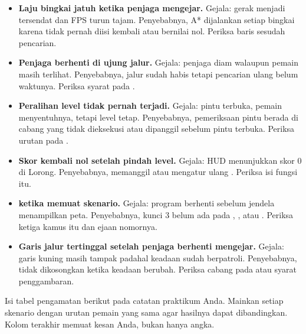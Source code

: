 \begin{galatbox}
\begin{itemize}[leftmargin=1.4em, itemsep=0.35em]
  \item \textbf{Laju bingkai jatuh ketika penjaga mengejar.}
        Gejala: gerak menjadi tersendat dan FPS turun tajam. Penyebabnya,
        A* dijalankan setiap bingkai karena  tidak pernah
        diisi kembali atau  bernilai nol. Periksa baris
         sesudah pencarian.
  \item \textbf{Penjaga berhenti di ujung jalur.}
        Gejala: penjaga diam walaupun pemain masih terlihat. Penyebabnya,
        jalur sudah habis tetapi pencarian ulang belum waktunya. Periksa
        syarat  pada .
  \item \textbf{Peralihan level tidak pernah terjadi.}
        Gejala: pintu terbuka, pemain menyentuhnya, tetapi level tetap.
        Penyebabnya, pemeriksaan pintu berada di cabang yang tidak dieksekusi
        atau  dipanggil sebelum pintu terbuka. Periksa
        urutan pada .
  \item \textbf{Skor kembali nol setelah pindah level.}
        Gejala: HUD menunjukkan skor 0 di Lorong. Penyebabnya,
         memanggil  atau mengatur ulang
        . Periksa isi fungsi itu.
  \item \textbf{ ketika memuat skenario.}
        Gejala: program berhenti sebelum jendela menampilkan peta.
        Penyebabnya, kunci 3 belum ada pada ,
        , atau . Periksa ketiga kamus
        itu dan ejaan nomornya.
  \item \textbf{Garis jalur tertinggal setelah penjaga berhenti mengejar.}
        Gejala: garis kuning masih tampak padahal keadaan sudah berpatroli.
        Penyebabnya,  tidak dikosongkan ketika keadaan
        berubah. Periksa cabang  pada  atau
        syarat penggambaran.
\end{itemize}
\end{galatbox}


Isi tabel pengamatan berikut pada catatan praktikum Anda. Mainkan setiap
skenario dengan urutan pemain yang sama agar hasilnya dapat dibandingkan.
Kolom terakhir memuat kesan Anda, bukan hanya angka.

